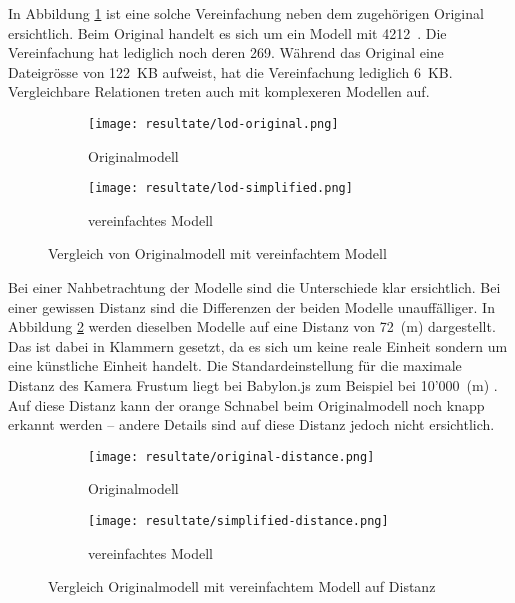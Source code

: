 In Abbildung \ref{fig:lodComparison} ist eine solche Vereinfachung neben dem zugehörigen Original ersichtlich. Beim Original handelt es sich um ein Modell mit 4212 . Die Vereinfachung hat lediglich noch deren 269. Während das Original eine Dateigrösse von 122 KB aufweist, hat die Vereinfachung lediglich 6 KB. Vergleichbare Relationen treten auch mit komplexeren Modellen auf.

\begin{figure}[H]
  \centering
  \begin{subfigure}{.4\textwidth}
    \centering
    \texttt{[image: resultate/lod-original.png]}
    \caption{Originalmodell}
  \end{subfigure}
  \begin{subfigure}{.4\textwidth}
    \centering
    \texttt{[image: resultate/lod-simplified.png]}
    \caption{vereinfachtes Modell}
  \end{subfigure}
  \caption{Vergleich von Originalmodell mit vereinfachtem Modell}
  \label{fig:lodComparison}
\end{figure}

Bei einer Nahbetrachtung der Modelle sind die Unterschiede klar ersichtlich. Bei einer gewissen Distanz sind die Differenzen der beiden Modelle unauffälliger. In Abbildung \ref{fig:lodComparisonDistance} werden dieselben Modelle auf eine Distanz von 72 (m) dargestellt. Das  ist dabei in Klammern gesetzt, da es sich um keine reale Einheit sondern um eine künstliche Einheit handelt. Die Standardeinstellung für die maximale Distanz des Kamera Frustum liegt bei Babylon.js zum Beispiel bei 10'000 (m) \cite{babylonMaxZ}. Auf diese Distanz kann der orange Schnabel beim Originalmodell noch knapp erkannt werden – andere Details sind auf diese Distanz jedoch nicht ersichtlich.

\begin{figure}[H]
  \centering
  \begin{subfigure}{.4\textwidth}
    \centering
    \texttt{[image: resultate/original-distance.png]}
    \caption{Originalmodell}
  \end{subfigure}
  \begin{subfigure}{.4\textwidth}
    \centering
    \texttt{[image: resultate/simplified-distance.png]}
    \caption{vereinfachtes Modell}
  \end{subfigure}
  \caption{Vergleich Originalmodell mit vereinfachtem Modell auf Distanz}
  \label{fig:lodComparisonDistance}
\end{figure}

